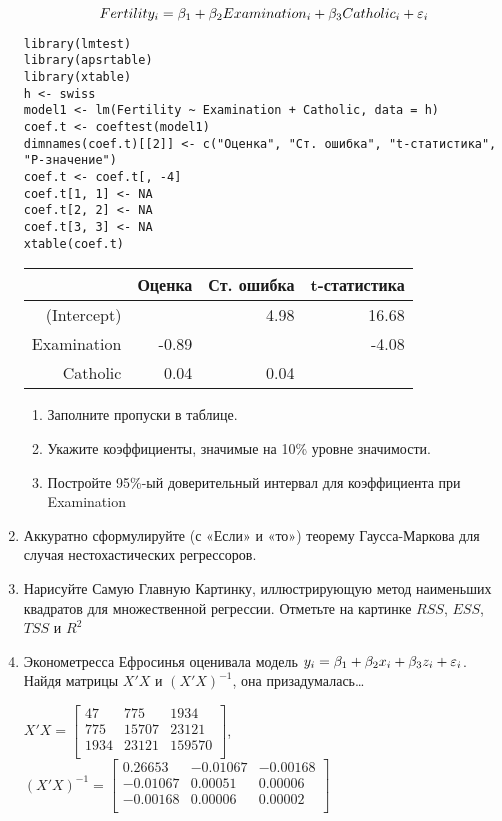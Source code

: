 \documentclass[12pt, a4paper]{article}
\theoremstyle{definition}
\begin{document}
\begin{enumerate}
\[Fertility_i=\beta_1+\beta_2 Examination_i+\beta_3 Catholic_i+\varepsilon_i\]

\begin{verbatim}
library(lmtest)
library(apsrtable)
library(xtable)
h <- swiss
model1 <- lm(Fertility ~ Examination + Catholic, data = h)
coef.t <- coeftest(model1)
dimnames(coef.t)[[2]] <- c("Оценка", "Ст. ошибка", "t-статистика", "P-значение")
coef.t <- coef.t[, -4]
coef.t[1, 1] <- NA
coef.t[2, 2] <- NA
coef.t[3, 3] <- NA
xtable(coef.t)
\end{verbatim}

\begin{tabular}{rrrr}
  \hline
 & Оценка & Ст. ошибка & t-статистика \\
  \hline
(Intercept) &  & 4.98 & 16.68 \\
  Examination & -0.89 &  & -4.08 \\
  Catholic & 0.04 & 0.04 &  \\
   \hline
\end{tabular}



\begin{enumerate}
\item Заполните пропуски в таблице.
\item Укажите коэффициенты, значимые на 10\% уровне значимости.
\item Постройте 95\%-ый доверительный интервал для коэффициента при Examination
\end{enumerate}

\item Аккуратно сформулируйте (с «Если» и «то») теорему Гаусса-Маркова для случая нестохастических регрессоров.

\item Нарисуйте Самую Главную Картинку, иллюстрирующую метод наименьших квадратов для множественной регрессии. Отметьте на картинке $RSS$, $ESS$, $TSS$ и $R^2$

\item Эконометресса Ефросинья оценивала модель $y_i=\beta_1 + \beta_2 x_i + \beta_3 z_i + \varepsilon_i$. Найдя матрицы $X'X$ и $(X'X)^{-1}$, она призадумалась\ldots

$X'X = \begin{bmatrix}{}
  47 & 775 & 1934 \\
  775 & 15707 & 23121 \\
  1934 & 23121 & 159570 \\
  \end{bmatrix}$,
$(X'X)^{-1}=\begin{bmatrix}{}
  0.26653 & -0.01067 & -0.00168 \\
  -0.01067 & 0.00051 & 0.00006 \\
  -0.00168 & 0.00006 & 0.00002 \\
  \end{bmatrix}$



\end{enumerate}
\end{document}
